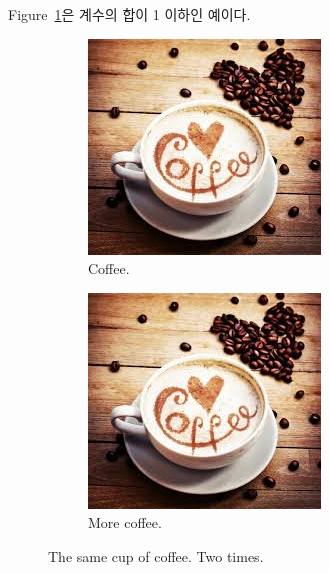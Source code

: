 \documentclass{article}
\begin{document}
	Figure~\ref{fig:coffee}은 계수의 합이 1 이하인 예이다.
	
	\begin{figure}[h!]
  		\centering
  		\begin{subfigure}[b]{0.4\linewidth}
    		\includegraphics[width=\linewidth]{coffee.jpg}
    		\caption{Coffee.}
  		\end{subfigure}
  		\begin{subfigure}[b]{0.4\linewidth}
    		\includegraphics[width=\linewidth]{coffee.jpg}
    		\caption{More coffee.}
  		\end{subfigure}
  		\caption{The same cup of coffee. Two times.}
  		\label{fig:coffee}
	\end{figure}
\end{document}
